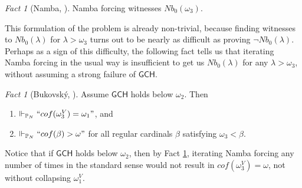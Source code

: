 \documentclass[12pt, twoside]{memoir}
\numberwithin{equation}{section}
\theoremstyle{definition}
\theoremstyle{remark}
\newtheorem{fact}[thm]{Fact}
\theoremstyle{definition}
\theoremstyle{definition}
\theoremstyle{definition}
\theoremstyle{remark}
\begin{document}
\begin{fact}[Namba, \cite{namba}]
Namba forcing witnesses $Nb_0(\omega_3)$.
\end{fact}

This formulation of the problem is already non-trivial, because finding witnesses to $Nb_0(\lambda)$ for $\lambda > \omega_3$ turns out to be nearly as difficult as proving $\neg Nb_0(\lambda)$. Perhaps as a sign of this difficulty, the following fact tells us that iterating Namba forcing in the usual way is insufficient to get us $Nb_0(\lambda)$ for any $\lambda > \omega_3$, without assuming a strong failure of $\mathsf{GCH}$. 

\begin{fact}[Bukovsk\'{y}, \cite{bukovsky}]\label{fact26}
Assume $\mathsf{GCH}$ holds below $\omega_2$. Then 
\begin{enumerate}[label=(\arabic*)]
    \item\label{fact261} $\Vdash_{\mathbb{P}_{N}} ``cof(\omega_3^V) = \omega_1"$, and
    \item $\Vdash_{\mathbb{P}_{N}} ``cof(\beta) > \omega"$ for all regular cardinals $\beta$ satisfying $\omega_3 < \beta$.
\end{enumerate}
\end{fact}

Notice that if $\mathsf{GCH}$ holds below $\omega_2$, then by Fact \ref{fact26}, iterating Namba forcing any number of times in the standard sense would not result in $cof(\omega_3^V) = \omega$, not without collapsing $\omega_1^V$.
\end{document}
